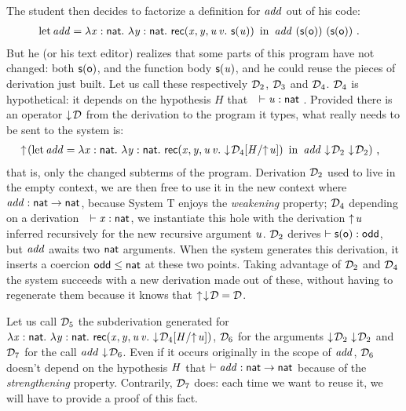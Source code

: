 \documentclass{llncs}
\begin{document}
The student then decides to factorize a definition for $\var{add}$ out
of his code:
\begin{align*}
  &\letb{add}{\tlam x {\cst{nat}} \tlam y {\cst{nat}} \recb {\var x}
    {\var y} u v {\s{\var u}}}
  \app{\var{add}}\app{(\s\z)}{(\s\z)} \ \text{.}
\end{align*}
But he (or his text editor) realizes that some parts of this program
have not changed: both $\s\z$, and the function body $\s{\var u}$, and
he could reuse the pieces of derivation just built. Let us call these
respectively $\md_2$, $\md_3$ and $\md_4$. $\md_4$ is hypothetical: it
depends on the hypothesis $H$ that\ \ $\vdash \var u:\cst{nat}$ .
Provided there is an operator $\fget\md$ from the derivation to the
program it types, what really needs to be sent to the system is:
\begin{align*}
  &\finfer{}(
    \letb{add}{\tlam x {\cst{nat}} \tlam y {\cst{nat}} \recb {\var x}
      {\var y} u v {\fget{\gsubst{\md_4}{\msubst{H}{\finfer{\var u}}}}}}
    \app{\var{add}}\app{\fget{\md_2}}{\fget{\md_2}}
  )
\ \text{,}
\end{align*}
that is, only the changed subterms of the program. Derivation $\md_2$
used to live in the empty context, we are then free to use it in the
new context where $\var{add}:\cst{nat}\to\cst{nat}$, because System
\sysname T enjoys the \emph{weakening} property; $\md_4$ depending on
a derivation\ \ $\vdash\var x:\cst{nat}$, we instantiate this hole
with the derivation $\finfer{\var u}$ inferred recursively for the new
recursive argument $\var u$. $\md_2$ derives $\vdash \s\z :
\cst{odd}$, but $\var{add}$ awaits two $\cst{nat}$ arguments. When the
system generates this derivation, it inserts a coercion $\cst{odd}
\leq \cst{nat}$ at these two points. Taking advantage of $\md_2$ and
$\md_4$ the system succeeds with a new derivation made out of these,
without having to regenerate them because it knows that
$\finfer{\fget\md} = \md$.

Let us call $\md_5$ the subderivation generated for $\tlam x
{\cst{nat}} \tlam y {\cst{nat}} \recb {\var x} {\var y} u v
{\fget{\gsubst{\md_4}{\msubst H {\finfer{\var u}}}}}$, $\md_6$ for the
arguments $\app{\fget{\md_2}}{\fget{\md_2}}$ and $\md_7$ for the call
$\app{\var{add}} {\fget{\md_6}}$. Even if it occurs originally in the
scope of $\var{add}$, $\md_6$ doesn't depend on the hypothesis $\var
H$ that $\vdash \var{add}:\cst{nat}\to\cst{nat}$ because of the
\emph{strengthening} property. Contrarily, $\md_7$ does: each time we
want to reuse it, we will have to provide a proof of this fact.
\end{document}

